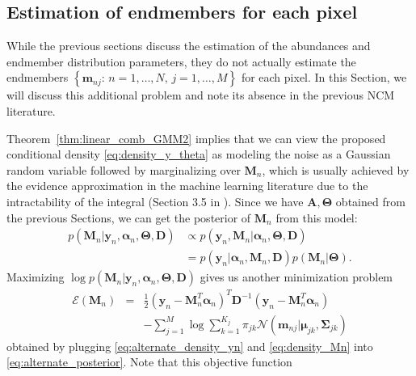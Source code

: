 \documentclass[twocolumn,english]{IEEEtran}
\theoremstyle{plain}
\begin{document}
\subsection{Estimation of endmembers for each pixel\label{subsec:Estimation-of-endmembers}}

While the previous sections discuss the estimation of the abundances
and endmember distribution parameters, they do not actually estimate
the endmembers $\left\{ \mathbf{m}_{nj}:\,n=1,\dots,N,\,j=1,\dots,M\right\} $
for each pixel. In this Section, we will discuss this additional problem
and note its absence in the previous NCM literature.

Theorem~\ref{thm:linear_comb_GMM2} implies that we can view the
proposed conditional density \eqref{eq:density_y_theta} as modeling
the noise as a Gaussian random variable followed by marginalizing
over $\mathbf{M}_{n}$, which is usually achieved by the evidence
approximation in the machine learning literature due to the intractability
of the integral (Section 3.5 in \cite{bishop2006pattern}). Since
we have $\mathbf{A},\boldsymbol{\Theta}$ obtained from the previous
Sections, we can get the posterior of $\mathbf{M}_{n}$ from this
model:
\begin{align}
p\left(\mathbf{M}_{n}\vert\mathbf{y}_{n},\boldsymbol{\alpha}_{n},\boldsymbol{\Theta},\mathbf{D}\right) & \propto p\left(\mathbf{y}_{n},\mathbf{M}_{n}\vert\boldsymbol{\alpha}_{n},\boldsymbol{\Theta},\mathbf{D}\right)\nonumber \\
 & =p\left(\mathbf{y}_{n}\vert\boldsymbol{\alpha}_{n},\mathbf{M}_{n},\mathbf{D}\right)p\left(\mathbf{M}_{n}\vert\boldsymbol{\Theta}\right).\label{eq:alternate_posterior}
\end{align}
Maximizing $\log p\left(\mathbf{M}_{n}\vert\mathbf{y}_{n},\boldsymbol{\alpha}_{n},\boldsymbol{\Theta},\mathbf{D}\right)$
gives us another minimization problem
\begin{eqnarray}
\mathcal{E}\left(\mathbf{M}_{n}\right) & = & \frac{1}{2}\left(\mathbf{y}_{n}-\mathbf{M}_{n}^{T}\boldsymbol{\alpha}_{n}\right)^{T}\mathbf{D}^{-1}\left(\mathbf{y}_{n}-\mathbf{M}_{n}^{T}\boldsymbol{\alpha}_{n}\right)\nonumber \\
 &  & -\sum_{j=1}^{M}\log\sum_{k=1}^{K_{j}}\pi_{jk}\mathcal{N}\left(\mathbf{m}_{nj}\vert\boldsymbol{\mu}_{jk},\boldsymbol{\Sigma}_{jk}\right)\label{eq:obj_fun_Mn}
\end{eqnarray}
obtained by plugging \eqref{eq:alternate_density_yn} and \eqref{eq:density_Mn}
into \eqref{eq:alternate_posterior}. Note that this objective function
\end{document}
